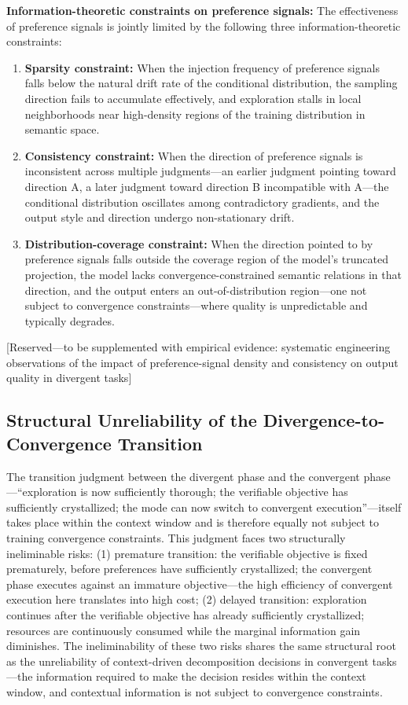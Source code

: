 \documentclass[11pt,a4paper]{article}
\theoremstyle{definition}
\begin{document}
\textbf{Information-theoretic constraints on preference signals:} The effectiveness of preference signals is jointly limited by the following three information-theoretic constraints:
\begin{enumerate}[leftmargin=*,itemsep=0.3em]
    \item \textbf{Sparsity constraint:} When the injection frequency of preference signals falls below the natural drift rate of the conditional distribution, the sampling direction fails to accumulate effectively, and exploration stalls in local neighborhoods near high-density regions of the training distribution in semantic space.
    \item \textbf{Consistency constraint:} When the direction of preference signals is inconsistent across multiple judgments---an earlier judgment pointing toward direction A, a later judgment toward direction B incompatible with A---the conditional distribution oscillates among contradictory gradients, and the output style and direction undergo non-stationary drift.
    \item \textbf{Distribution-coverage constraint:} When the direction pointed to by preference signals falls outside the coverage region of the model's truncated projection, the model lacks convergence-constrained semantic relations in that direction, and the output enters an out-of-distribution region---one not subject to convergence constraints---where quality is unpredictable and typically degrades.
\end{enumerate}

{[}Reserved---to be supplemented with empirical evidence: systematic engineering observations of the impact of preference-signal density and consistency on output quality in divergent tasks{]}

\subsection{Structural Unreliability of the Divergence-to-Convergence Transition}

The transition judgment between the divergent phase and the convergent phase---``exploration is now sufficiently thorough; the verifiable objective has sufficiently crystallized; the mode can now switch to convergent execution''---itself takes place within the context window and is therefore equally not subject to training convergence constraints. This judgment faces two structurally ineliminable risks: (1) premature transition: the verifiable objective is fixed prematurely, before preferences have sufficiently crystallized; the convergent phase executes against an immature objective---the high efficiency of convergent execution here translates into high cost; (2) delayed transition: exploration continues after the verifiable objective has already sufficiently crystallized; resources are continuously consumed while the marginal information gain diminishes. The ineliminability of these two risks shares the same structural root as the unreliability of context-driven decomposition decisions in convergent tasks---the information required to make the decision resides within the context window, and contextual information is not subject to convergence constraints.
\end{document}
